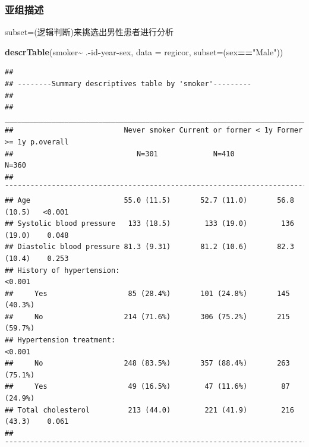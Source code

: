 \documentclass[
]{article}
\newenvironment{Shaded}{\begin{snugshade}}{\end{snugshade}}
\newcommand{\AttributeTok}[1]{\textcolor[rgb]{0.13,0.29,0.53}{#1}}
\newcommand{\FunctionTok}[1]{\textcolor[rgb]{0.13,0.29,0.53}{\textbf{#1}}}
\newcommand{\NormalTok}[1]{#1}
\newcommand{\SpecialCharTok}[1]{\textcolor[rgb]{0.81,0.36,0.00}{\textbf{#1}}}
\newcommand{\StringTok}[1]{\textcolor[rgb]{0.31,0.60,0.02}{#1}}
\begin{document}
\subsubsection{\texorpdfstring{\textbf{亚组描述}}{亚组描述}}\label{ux4e9aux7ec4ux63cfux8ff0}

subset=(逻辑判断)来挑选出男性患者进行分析

\begin{Shaded}
\begin{Highlighting}[]
\FunctionTok{descrTable}\NormalTok{(}\StringTok{\textasciigrave{}}\AttributeTok{smoker}\StringTok{\textasciigrave{}}\SpecialCharTok{\textasciitilde{}}\NormalTok{ .}\SpecialCharTok{{-}}\NormalTok{id}\SpecialCharTok{{-}}\NormalTok{year}\SpecialCharTok{{-}}\NormalTok{sex, }\AttributeTok{data =}\NormalTok{ regicor,}
           \AttributeTok{subset=}\NormalTok{(sex}\SpecialCharTok{==}\StringTok{"Male"}\NormalTok{))}
\end{Highlighting}
\end{Shaded}

\begin{verbatim}
## 
## --------Summary descriptives table by 'smoker'---------
## 
## ___________________________________________________________________________________ 
##                          Never smoker Current or former < 1y Former >= 1y p.overall 
##                             N=301             N=410             N=360               
## ¯¯¯¯¯¯¯¯¯¯¯¯¯¯¯¯¯¯¯¯¯¯¯¯¯¯¯¯¯¯¯¯¯¯¯¯¯¯¯¯¯¯¯¯¯¯¯¯¯¯¯¯¯¯¯¯¯¯¯¯¯¯¯¯¯¯¯¯¯¯¯¯¯¯¯¯¯¯¯¯¯¯¯ 
## Age                      55.0 (11.5)       52.7 (11.0)       56.8 (10.5)   <0.001   
## Systolic blood pressure   133 (18.5)        133 (19.0)        136 (19.0)    0.048   
## Diastolic blood pressure 81.3 (9.31)       81.2 (10.6)       82.3 (10.4)    0.253   
## History of hypertension:                                                   <0.001   
##     Yes                   85 (28.4%)       101 (24.8%)       145 (40.3%)            
##     No                   214 (71.6%)       306 (75.2%)       215 (59.7%)            
## Hypertension treatment:                                                    <0.001   
##     No                   248 (83.5%)       357 (88.4%)       263 (75.1%)            
##     Yes                   49 (16.5%)        47 (11.6%)        87 (24.9%)            
## Total cholesterol         213 (44.0)        221 (41.9)        216 (43.3)    0.061   
## ¯¯¯¯¯¯¯¯¯¯¯¯¯¯¯¯¯¯¯¯¯¯¯¯¯¯¯¯¯¯¯¯¯¯¯¯¯¯¯¯¯¯¯¯¯¯¯¯¯¯¯¯¯¯¯¯¯¯¯¯¯¯¯¯¯¯¯¯¯¯¯¯¯¯¯¯¯¯¯¯¯¯¯
\end{verbatim}
\end{document}
